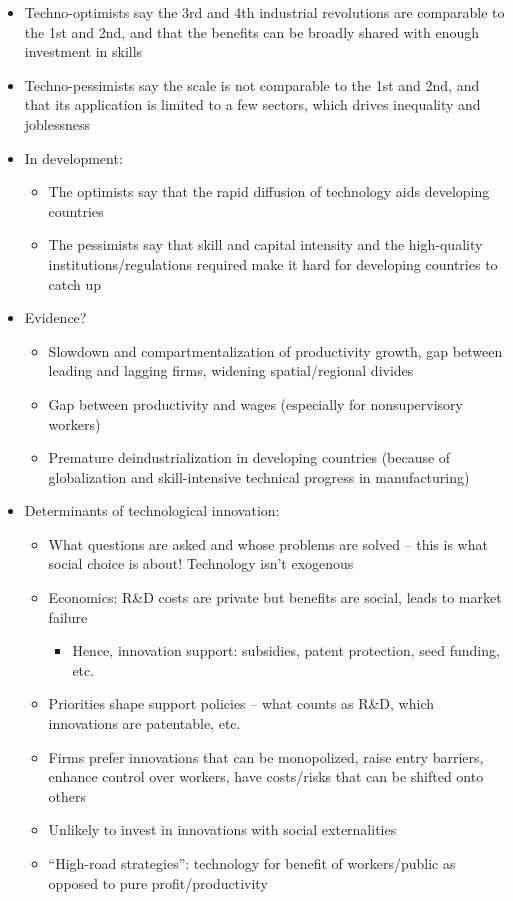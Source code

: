 \begin{itemize}
\tightlist
\item
  Techno-optimists say the 3rd and 4th industrial revolutions are
  comparable to the 1st and 2nd, and that the benefits can be broadly
  shared with enough investment in skills
\item
  Techno-pessimists say the scale is not comparable to the 1st and 2nd,
  and that its application is limited to a few sectors, which drives
  inequality and joblessness
\item
  In development:

  \begin{itemize}
  \tightlist
  \item
    The optimists say that the rapid diffusion of technology aids
    developing countries
  \item
    The pessimists say that skill and capital intensity and the
    high-quality institutions/regulations required make it hard for
    developing countries to catch up
  \end{itemize}
\item
  Evidence?

  \begin{itemize}
  \tightlist
  \item
    Slowdown and compartmentalization of productivity growth, gap
    between leading and lagging firms, widening spatial/regional divides
  \item
    Gap between productivity and wages (especially for nonsupervisory
    workers)
  \item
    Premature deindustrialization in developing countries (because of
    globalization and skill-intensive technical progress in
    manufacturing)
  \end{itemize}
\item
  Determinants of technological innovation:

  \begin{itemize}
  \tightlist
  \item
    What questions are asked and whose problems are solved -- this is
    what social choice is about! Technology isn't exogenous
  \item
    Economics: R\&D costs are private but benefits are social, leads to
    market failure

    \begin{itemize}
    \tightlist
    \item
      Hence, innovation support: subsidies, patent protection, seed
      funding, etc.
    \end{itemize}
  \item
    Priorities shape support policies -- what counts as R\&D, which
    innovations are patentable, etc.
  \item
    Firms prefer innovations that can be monopolized, raise entry
    barriers, enhance control over workers, have costs/risks that can be
    shifted onto others
  \item
    Unlikely to invest in innovations with social externalities
  \item
    ``High-road strategies'': technology for benefit of workers/public
    as opposed to pure profit/productivity


\end{itemize}
\end{itemize}
